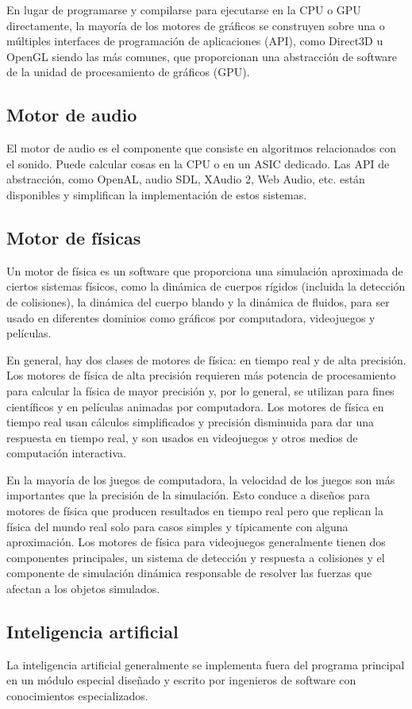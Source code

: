 En lugar de programarse y compilarse para ejecutarse en la CPU o GPU directamente, la mayoría de los motores de gráficos se construyen sobre una o múltiples interfaces de programación de aplicaciones (API), como Direct3D u OpenGL siendo las más comunes, que proporcionan una abstracción de software de la unidad de procesamiento de gráficos (GPU).

\subsection{Motor de audio}

El motor de audio es el componente que consiste en algoritmos relacionados con el sonido. Puede calcular cosas en la CPU o en un ASIC dedicado. Las API de abstracción, como OpenAL, audio SDL, XAudio 2, Web Audio, etc. están disponibles y simplifican la implementación de estos sistemas.

\subsection{Motor de físicas}

Un motor de física es un software que proporciona una simulación aproximada de ciertos sistemas físicos, como la dinámica de cuerpos rígidos (incluida la detección de colisiones), la dinámica del cuerpo blando y la dinámica de fluidos, para ser usado en diferentes dominios como gráficos por computadora, videojuegos y películas.

En general, hay dos clases de motores de física: en tiempo real y de alta precisión. Los motores de física de alta precisión requieren más potencia de procesamiento para calcular la física de mayor precisión y, por lo general, se utilizan para fines científicos y en películas animadas por computadora. Los motores de física en tiempo real usan cálculos simplificados y precisión disminuida para dar una respuesta en tiempo real, y son usados en videojuegos y otros medios de computación interactiva.

En la mayoría de los juegos de computadora, la velocidad de los juegos son más importantes que la precisión de la simulación. Esto conduce a diseños para motores de física que producen resultados en tiempo real pero que replican la física del mundo real solo para casos simples y típicamente con alguna aproximación. Los motores de física para videojuegos generalmente tienen dos componentes principales, un sistema de detección y respuesta a colisiones y el componente de simulación dinámica responsable de resolver las fuerzas que afectan a los objetos simulados.

\subsection{Inteligencia artificial}

La inteligencia artificial generalmente se implementa fuera del programa principal en un módulo especial diseñado y escrito por ingenieros de software con conocimientos especializados.
